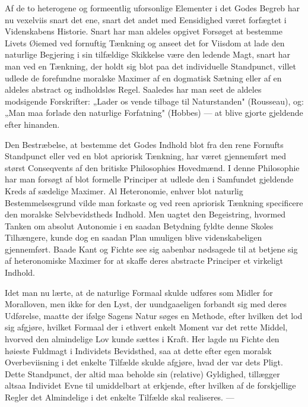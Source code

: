 \documentclass[12pt]{article}
\newcommand{\opage}[1]{\marginnote{\footnotesize\textit{[#1]}}}
\begin{document}
Af de to heterogene og formeentlig uforsonlige Elementer i det Godes Begreb har nu vexelviis snart det ene, snart det andet med Eensidighed været forfægtet i Videnskabens Historie. Snart har man aldeles opgivet Forsøget at bestemme Livets Øiemed ved fornuftig Tænkning og anseet det for Viisdom at lade den naturlige Begjering i sin tilfældige Skikkelse være den ledende Magt, snart har man ved en Tænkning, der holdt sig blot paa det individuelle Standpunct, villet udlede de forefundne moralske Maximer af en dogmatisk Sætning eller af en aldeles abstract og indholdsløs Regel. Saaledes har man seet de aldeles modsigende Forskrifter: „Lader os vende tilbage til Naturstanden" (Rousseau), og: „Man maa forlade den naturlige Forfatning" (Hobbes) --- at blive gjorte gjeldende efter hinanden.

Den Bestræbelse, at bestemme det Godes Indhold blot fra den rene Fornufts Standpunct eller ved en blot apriorisk Tænkning, har været gjennemført med størst Conseqvents af den britiske Philosophies Hovedmænd. I denne Philosophie har man forsøgt af blot formelle Principer at udlede den i Samfundet gjeldende Kreds af sædelige Maximer. Al Heteronomie, enhver blot naturlig Bestemmelsesgrund vilde man forkaste og ved reen \opage{154}apriorisk Tænkning specificere den moralske Selvbevidstheds Indhold. Men uagtet den Begeistring, hvormed Tanken om absolut Autonomie i en saadan Betydning fyldte denne Skoles Tilhængere, kunde dog en saadan Plan umuligen blive videnskabeligen gjennemført. Baade Kant og Fichte see sig aabenbar nødsagede til at betjene sig af heteronomiske Maximer for at skaffe deres abstracte Principer et virkeligt Indhold.

Idet man nu lærte, at de naturlige Formaal skulde udføres som Midler for Moralloven, men ikke for den Lyst, der uundgaaeligen forbandt sig med deres Udførelse, maatte der ifølge Sagens Natur søges en Methode, efter hvilken det lod sig afgjøre, hvilket Formaal der i ethvert enkelt Moment var det rette Middel, hvorved den almindelige Lov kunde sættes i Kraft. Her lagde nu Fichte den høieste Fuldmagt i Individets Bevidsthed, saa at dette efter egen moralsk Overbeviisning i det enkelte Tilfælde skulde afgjøre, hvad der var dets Pligt. Dette Standpunct, der altid maa beholde sin (relative) Gyldighed, tillægger altsaa Individet Evne til umiddelbart at erkjende, efter hvilken af de forskjellige Regler det Almindelige i det enkelte Tilfælde skal realiseres. ---
\end{document}
